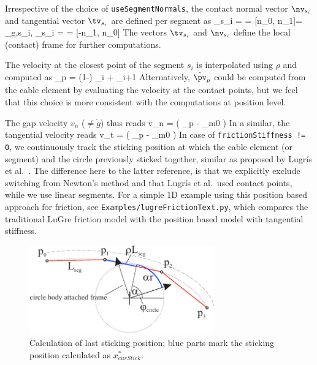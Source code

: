     Irrespective of the choice of \texttt{useSegmentNormals}, the contact normal vector $\nv_{s_i}$ and tangential vector $\tv_{s_i}$ are defined per segment as
    \be
      \nv_{s_i} = \nv = [n_0, n_1]\tp =  \dv_{g,s_i}, \quad \tv_{s_i} = \tv = [-n_1, n_0]\tp
    \ee
    The vectors $\tv_{s_i}$ and $\nv_{s_i}$ define the local (contact) frame for further computations.
    
    The velocity at the closest point of the segment $s_i$ is interpolated using $\rho$ and computed as
    \be
      \dot \pv_p = (1-\rho) \cdot \vv_i + \rho \cdot \vv_{i+1}
    \ee
    Alternatively, $\dot \pv_p$ could be computed from the cable element by evaluating the velocity at the contact points, but we feel that
    this choice is more consistent with the computations at position level.
    
    The gap velocity $v_n$ ($\neq \dot g$) thus reads
    \be
      v_n = \left( \dot \pv_p - \dot \pv_{m0} \right) \nv
    \ee
    In a similar, the tangential velocity reads
    \be \label{ObjectContactFrictionCircleCable2D:vTangent}
      v_t = \left( \dot \pv_p - \dot \pv_{m0} \right) \tv
    \ee
    In case of \texttt{frictionStiffness != 0}, we continuously track the sticking position at which the cable element (or segment) and the circle 
    previously sticked together, similar as proposed by Lugr{\'i}s et al.~\cite{LugrisEscalonaDC2011}. 
    The difference here to the latter reference, is that we explicitly exclude switching from Newton's method and that Lugr{\'i}s et al.~used
    contact points, while we use linear segments.
    For a simple 1D example using this position based approach for friction, see \texttt{Examples/lugreFrictionText.py}, 
    which compares the traditional LuGre friction model \cite{CanudasDeWitEtAl1993} with the position based model with tangential stiffness. 
    \begin{figure}[tbph]
      \begin{center}
      \includegraphics[width=8cm]{figures/ContactFrictionCircleCable2DstickingPos.pdf}
      \end{center}
      \caption{Calculation of last sticking position; blue parts mark the sticking position calculated as $x^*_{curStick}$.}
    	\label{fig:ObjectContactFrictionCircleCable2D:stickingPos}
    \end{figure}
    
